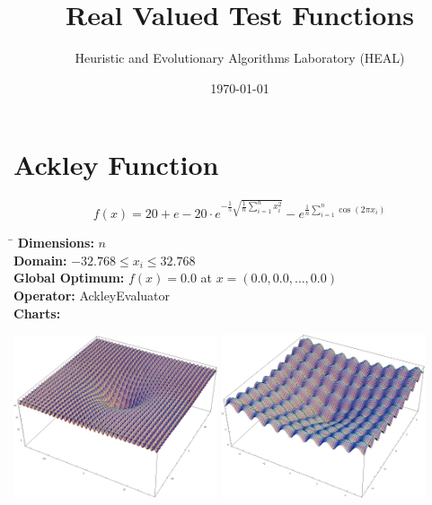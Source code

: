 \documentclass[12pt, a4paper]{article}
\title{Real Valued Test Functions}
\author{Heuristic and Evolutionary Algorithms Laboratory (HEAL)}
\date{\today}
\begin{document}
	\maketitle

	\section*{Ackley Function}
		\begin{equation*}
			f(x) = 20 + e - 20 \cdot e^{-\frac{1}{5} \sqrt{\frac{1}{n} \sum_{i=1}^n x_i^2}} - e^{\frac{1}{n} \sum_{i=1}^n \cos(2 \pi x_i)}
		\end{equation*}

		\begin{tabbing}
			\hspace{5cm}\=\kill
			\textbf{Dimensions:}     \> $n$ \\
			\textbf{Domain:}         \> $-32.768 \leq x_i \leq 32.768$ \\
			\textbf{Global Optimum:} \> $f(x) = 0.0$ at $x = (0.0, 0.0, \dots, 0.0)$ \\
			\textbf{Operator:}       \> AckleyEvaluator \\
			\textbf{Charts:}         \> \\
		\end{tabbing}

		\begin{center}
			\includegraphics[width=0.45\textwidth]{Images/Ackley_large}
			\hfill
			\includegraphics[width=0.45\textwidth]{Images/Ackley_small}
		\end{center}
\end{document}
